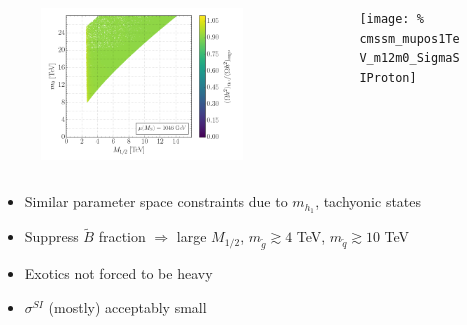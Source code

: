 \documentclass[10pt,aspectratio=169]{beamer}
\begin{document}
\begin{frame}
\begin{columns}[t]
\begin{column}{0.7\textwidth}
\begin{columns}[t]
\begin{column}{0.5\textwidth}
\begin{figure}
            \includegraphics[width=0.93\textwidth]{cmssm_mupos1TeV_m12m0_Omega}
          \end{figure}
        \end{column}
        \begin{column}{0.5\textwidth}
          \vspace{-35pt}
          \begin{figure}
            \centering
            \texttt{[image: \%
              cmssm\_mupos1TeV\_m12m0\_SigmaSIProton]}
          \end{figure}
        \end{column}
      \end{columns}
      \begin{itemize}\itemsep1em
        \item Similar parameter space constraints due to $m_{h_1}$,
          tachyonic states
        \item Suppress $\tilde{B}$ fraction $\Rightarrow$
          large $M_{1/2}$, {\color{red} $m_{\tilde{g}} \gtrsim 4$ TeV,
          $m_{\tilde{q}} \gtrsim 10$ TeV}
        \item {\color{blue} Exotics not forced to be heavy}
        \item $\sigma^{SI}$ (mostly) acceptably small
      \end{itemize}
    \end{column}
  \end{columns}
\end{frame}
\end{document}
